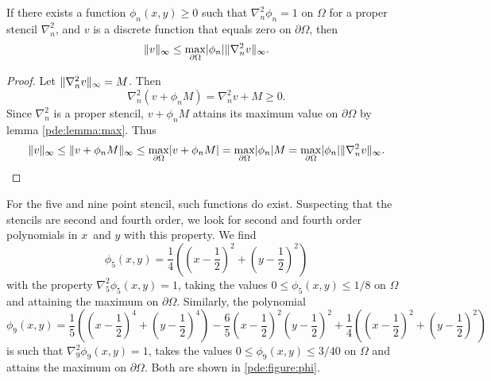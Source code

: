 \begin{lemma}\label{pde:lemma:bound}
  If there exists a function $\phi_n(x,y) \geq 0$ such that $\nabla_n^2 \phi_n = 1$ on $\Omega$ for a proper stencil $\nabla_n^2$, and $v$ is a discrete function that equals zero on $\partial \Omega$, then
  \begin{equation}
    \lVert v \rVert_\infty \leq \max_{\partial\Omega} \lvert \phi_n \rvert
    \lVert \nabla_n^2 v \rVert_\infty.
  \end{equation}
\end{lemma}
\begin{proof}

Let $\lVert \nabla_n^2 v \rVert_\infty = M$.
Then
$$
\nabla_n^2 (v + \phi_n M) = \nabla_n^2 v +  M \geq 0.
$$
Since $\nabla_n^2$ is a proper stencil, $v + \phi_n M$ attains its maximum value on $\partial \Omega$ by lemma \ref{pde:lemma:max}.
Thus
\begin{equation*}
\lVert v \rVert_\infty
\leq \lVert v + \phi_n M \rVert_\infty
\leq \max_{\partial \Omega} \lvert v + \phi_n M\rvert
= \max_{\partial\Omega} \lvert \phi_n \rvert M
= \max_{\partial\Omega} \lvert \phi_n \rvert \lVert \nabla_n^2 v \rVert_\infty. \qedhere
\end{equation*}
\end{proof}

\begin{remark}
  For the five and nine point stencil, such functions do exist.
  Suspecting that the stencils are second and fourth order, we look for second and fourth order polynomials in $x$ and $y$ with this property.
  We find 
  \begin{equation}
    \phi_5(x,y) = \frac14 \left(\left(x-\frac12\right)^2 + \left(y-\frac12\right)^2\right)
    \label{pde:equation:phi5}
  \end{equation}
  with the property $\nabla_5^2 \phi_5(x,y) = 1$, taking the values $0 \leq \phi_5(x,y) \leq 1/8$ on $\Omega$ and attaining the maximum on $\partial \Omega$.
  \newcommand{\phinine}{\frac{1}{5} \left(\left(x-\frac{1}{2}\right)^4+\left(y-\frac{1}{2}\right)^4\right) - \frac{6}{5} \left(x-\frac{1}{2}\right)^2\left(y-\frac{1}{2}\right)^2 + \frac{1}{4} \left(\left(x-\frac{1}{2}\right)^2+\left(y-\frac{1}{2}\right)^2\right)}
  Similarly, the polynomial
  \begin{equation}
  \phi_9(x,y) = \phinine
  \label{pde:equation:phi9}
  \end{equation}
  is such that $\nabla_9^2 \phi_9(x,y) = 1$, takes the values $0 \leq \phi_9(x,y) \leq 3/40$ on $\Omega$ and attains the maximum on $\partial \Omega$.
  Both are shown in \cref{pde:figure:phi}.
\end{remark}

